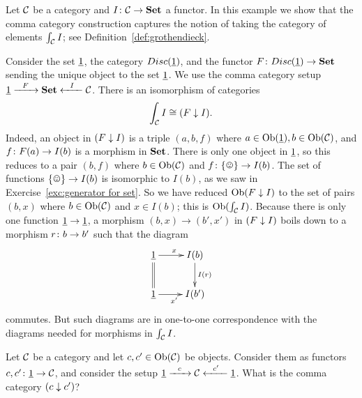 \documentclass[CT4S-EN-RU]{subfiles}
\begin{document}
\begin{exampleENG}
Let $\mathcal{C}$ be a category and $I\colon\mathcal{C}\rightarrow{\mathbf{Set}}$ a functor. In this example we show that the comma category construction captures the notion of taking the category of elements $\int_\mathcal{C} I$; see Definition~\ref{def:grothendieck}. 

Consider the set $\underline{1}$, the category $Disc(\underline{1})$, and the functor $F\colon Disc(\underline{1})\rightarrow{\mathbf{Set}}$ sending the unique object to the set $\underline{1}$. We use the comma category setup $\underline{1}\xrightarrow{\ \ F\ \ }{\mathbf{Set}}\xleftarrow{\ \ I\ \ }\mathcal{C}$. There is an isomorphism of categories 
$$\int_\mathcal{C} I\cong (F\downarrow I).$$
Indeed, an object in $(F\downarrow I)$ is a triple $(a,b,f)$ where $a\in\textnormal{Ob}(\underline{1}), b\in\textnormal{Ob}(\mathcal{C})$, and $f\colon F(a)\rightarrow I(b)$ is a morphism in ${\mathbf{Set}}$. There is only one object in $\underline{1}$, so this reduces to a pair $(b,f)$ where $b\in\textnormal{Ob}(\mathcal{C})$ and $f\taking \singleton\to I(b)$. The set of functions $\singleton\to I(b)$ is isomorphic to $I(b)$, as we saw in Exercise~\ref{exc:generator for set}. So we have reduced $\textnormal{Ob}(F\downarrow I)$ to the set of pairs $(b,x)$ where $b\in\textnormal{Ob}(\mathcal{C})$ and $x\in I(b)$; this is $\textnormal{Ob}(\int_\mathcal{C} I)$. Because there is only one function $\underline{1}\rightarrow\underline{1}$, a morphism $(b,x)\to(b',x')$ in $(F\downarrow I)$ boils down to a morphism $r\colon b\rightarrow b'$ such that the diagram 
$$\xymatrix{\ul{1}\ar[r]^x\ar@{=}[d]&I(b)\ar[d]^{I(r)}\\\ul{1}\ar[r]_{x'}&I(b')}$$
commutes. But such diagrams are in one-to-one correspondence with the diagrams needed for morphisms in $\int_\mathcal{C} I$.
\end{exampleENG}

\begin{exampleRUS}
\end{exampleRUS}

\begin{exerciseENG}
Let $\mathcal{C}$ be a category and let $c,c'\in\textnormal{Ob}(\mathcal{C})$ be objects. Consider them as functors $c,c'\colon\underline{1}\rightarrow\mathcal{C}$, and consider the setup $\underline{1}\xrightarrow{\ \ c\ \ }\mathcal{C}\xleftarrow{\ \ c'\ \ }\underline{1}$. What is the comma category $(c\downarrow c')$?
\end{exerciseENG}

\begin{exerciseRUS}
\end{exerciseRUS}


\subsection{}\label{sec:arithmetic of categories}
\end{document}
